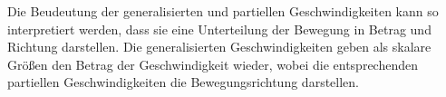 Die Beudeutung der generalisierten und partiellen Geschwindigkeiten kann so interpretiert werden, dass sie eine Unterteilung der Bewegung in Betrag und Richtung darstellen. Die generalisierten Geschwindigkeiten geben als skalare Größen den Betrag der Geschwindigkeit wieder, wobei die entsprechenden partiellen Geschwindigkeiten die Bewegungsrichtung darstellen.
